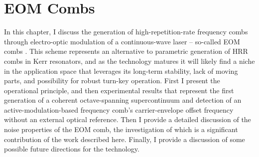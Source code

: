  \chapter{EOM Combs}

In this chapter, I discuss the generation of high-repetition-rate frequency combs through electro-optic modulation of a continuous-wave laser – so-called EOM combs \cite{Kobayashi1972,Kourogi1993,Murata2000,Sakamoto2007,Morohashi2008,Ishizawa2010,Wu2010,Supradeepa2012,Metcalf2013,Wu2013}. This scheme represents an alternative to parametric generation of HRR combs in Kerr resonators, and as the technology matures it will likely find a niche in the application space that leverages its long-term stability, lack of moving parts, and possibility for robust turn-key operation. First I present the operational principle, and then experimental results that represent the first generation of a coherent octave-spanning supercontinuum and detection of an active-modulation-based frequency comb's carrier-envelope offset frequency without an external optical reference. Then I provide a detailed discussion of the noise properties of the EOM comb, the investigation of which is a significant contribution of the work described here. Finally, I provide a discussion of some possible future directions for the technology.


